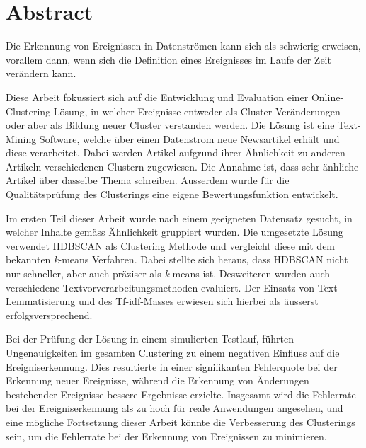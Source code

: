 
\section*{Abstract}

Die Erkennung von Ereignissen in Datenströmen kann sich als schwierig erweisen, vorallem dann,
wenn sich die Definition eines Ereignisses im Laufe der Zeit verändern kann.

Diese Arbeit fokussiert sich auf die Entwicklung und Evaluation einer Online-Clustering Lösung,
in welcher Ereignisse entweder als Cluster-Veränderungen oder aber als Bildung neuer Cluster
verstanden werden.
Die Lösung ist eine Text-Mining Software, welche über einen Datenstrom neue Newsartikel erhält
und diese verarbeitet.
Dabei werden Artikel aufgrund ihrer Ähnlichkeit zu anderen Artikeln verschiedenen Clustern zugewiesen.
Die Annahme ist, dass sehr änhliche Artikel über dasselbe Thema schreiben.
Ausserdem wurde für die Qualitätsprüfung des Clusterings eine eigene Bewertungsfunktion entwickelt.

Im ersten Teil dieser Arbeit wurde nach einem geeigneten Datensatz gesucht,
in welcher Inhalte gemäss Ähnlichkeit gruppiert wurden.
Die umgesetzte Lösung verwendet HDBSCAN als Clustering Methode und vergleicht diese mit
dem bekannten \textit{k}-means Verfahren.
Dabei stellte sich heraus, dass HDBSCAN nicht nur schneller, aber auch präziser als \textit{k}-means ist.
Desweiteren wurden auch verschiedene Textvorverarbeitungsmethoden evaluiert.
Der Einsatz von Text Lemmatisierung und des Tf-idf-Masses erwiesen sich hierbei als äusserst erfolgsversprechend.

Bei der Prüfung der Lösung in einem simulierten Testlauf, führten Ungenauigkeiten im gesamten Clustering
zu einem negativen Einfluss auf die Ereigniserkennung.
Dies resultierte in einer signifikanten Fehlerquote bei der Erkennung neuer Ereignisse,
während die Erkennung von Änderungen bestehender Ereignisse bessere Ergebnisse erzielte.
Insgesamt wird die Fehlerrate bei der Ereigniserkennung als zu hoch für reale Anwendungen angesehen,
und eine mögliche Fortsetzung dieser Arbeit könnte die Verbesserung des Clusterings sein,
um die Fehlerrate bei der Erkennung von Ereignissen zu minimieren.
